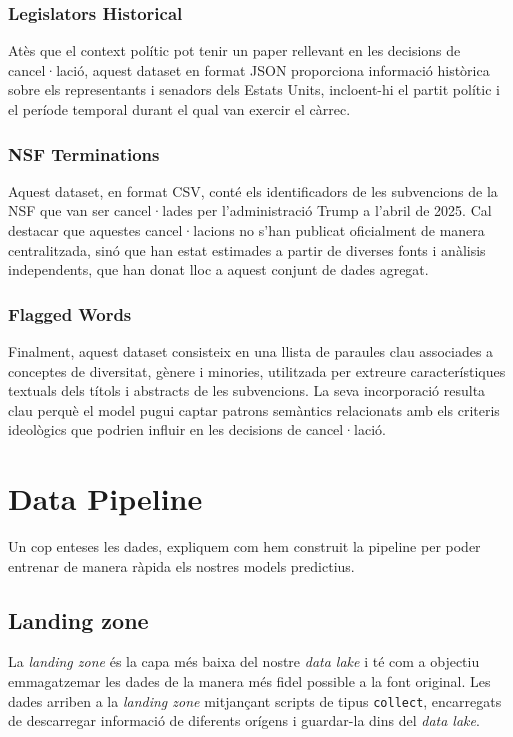 \documentclass[12pt, a4paper]{article}
\begin{document}
\subsubsection{Legislators Historical}
Atès que el context polític pot tenir un paper rellevant en les decisions de cancel·lació, aquest dataset en format JSON proporciona informació històrica sobre els representants i senadors dels Estats Units, incloent-hi el partit polític i el període temporal durant el qual van exercir el càrrec.

\subsubsection{NSF Terminations}
Aquest dataset, en format CSV, conté els identificadors de les subvencions de la NSF que van ser cancel·lades per l’administració Trump a l’abril de 2025. Cal destacar que aquestes cancel·lacions no s’han publicat oficialment de manera centralitzada, sinó que han estat estimades a partir de diverses fonts i anàlisis independents, que han donat lloc a aquest conjunt de dades agregat.

\subsubsection{Flagged Words}
Finalment, aquest dataset consisteix en una llista de paraules clau associades a conceptes de diversitat, gènere i minories, utilitzada per extreure característiques textuals dels títols i abstracts de les subvencions. La seva incorporació resulta clau perquè el model pugui captar patrons semàntics relacionats amb els criteris ideològics que podrien influir en les decisions de cancel·lació.


\section{Data Pipeline}
Un cop enteses les dades, expliquem com hem construit la pipeline per poder entrenar de manera ràpida els nostres models predictius.
\subsection{Landing zone}

La \textit{landing zone} és la capa més baixa del nostre \textit{data lake} i té com a objectiu emmagatzemar les dades de la manera més fidel possible a la font original. Les dades arriben a la \textit{landing zone} mitjançant scripts de tipus \texttt{collect}, encarregats de descarregar informació de diferents orígens i guardar-la dins del \textit{data lake}.
\end{document}
